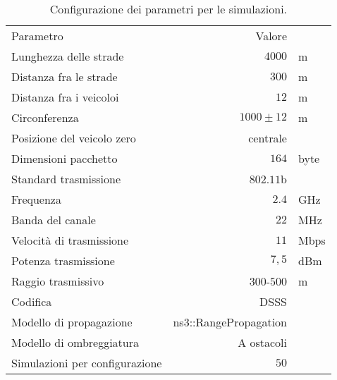 \begin{table}[!h]
	\centering
	\begin{tabular}{| L{.4\linewidth} | r  l |}
		\toprule
		Parametro															&			Valore 							&					\\
		\thickerline
		Lunghezza delle strade								&			$4000$							& m				\\
		Distanza fra le strade								&			$300$								& m				\\
		Distanza fra i veicoloi								&			$12$ 								& m				\\
		Circonferenza													&			$1000\pm12$					& m				\\
		Posizione del veicolo zero						&			centrale						&					\\
		\thickerline
		Dimensioni pacchetto									&				$164$							&			byte		\\	\hline
		Standard trasmissione									&				$802.11$b					&							\\	\hline
		Frequenza															&				$2.4$							&			GHz			\\	\hline
		Banda del canale											&				$22$							&			MHz			\\	\hline
		Velocità di trasmissione							&				$11$							&			Mbps		\\	\hline
		Potenza trasmissione									&				$7,5$							&			dBm			\\	\hline
		Raggio trasmissivo										&				$300$-$500$				&			m				\\	\hline
		Codifica															&				DSSS\footnotemark	&							\\	\hline
		Modello di propagazione								&				\textsf{ns3::RangePropagation}	&							\\	\hline
		Modello di ombreggiatura							&				A ostacoli				&							\\	\hline
		\thickerline
		Simulazioni	per configurazione				&			$50$								&					\\
		\bottomrule
	\end{tabular}
	\caption{Configurazione dei parametri per le simulazioni.\label{tab:parametri-simulazioni-barichello}}
\end{table}
%

